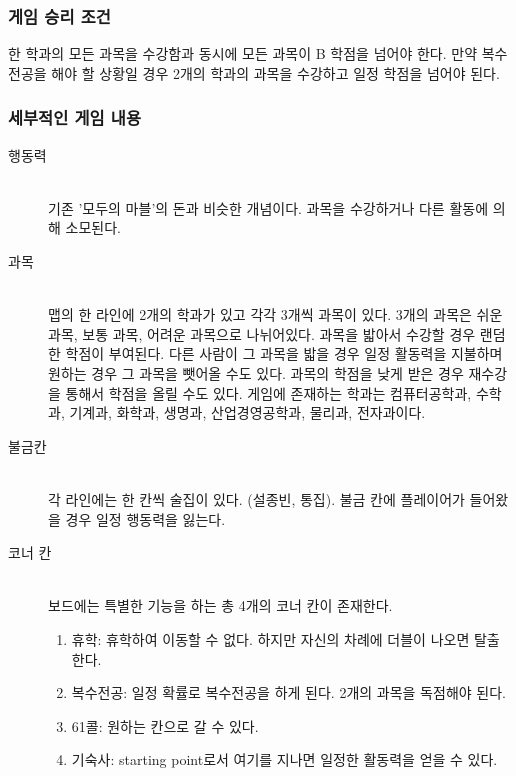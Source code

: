 \documentclass[10pt,oneside,a4paper,titlepage]{article}
\begin{document}
\subsubsection{게임 승리 조건}
한 학과의 모든 과목을 수강함과 동시에 모든 과목이 B 학점을 넘어야 한다. 만약 복수전공을 해야 할 상황일 경우 2개의 학과의 과목을 수강하고 일정 학점을 넘어야 된다.

\subsubsection{세부적인 게임 내용}

\begin{description}

\item[행동력] \hfill \\
기존 '모두의 마블'의 돈과 비슷한 개념이다. 과목을 수강하거나 다른 활동에 의해 소모된다. 

\item[과목] \hfill \\
맵의 한 라인에 2개의 학과가 있고 각각 3개씩 과목이 있다. 3개의 과목은 쉬운 과목, 보통 과목, 어려운 과목으로 나뉘어있다. 과목을 밟아서 수강할 경우 랜덤한 학점이 부여된다. 다른 사람이 그 과목을 밟을 경우 일정 활동력을 지불하며 원하는 경우 그 과목을 뺏어올 수도 있다. 과목의 학점을 낮게 받은 경우 재수강을 통해서 학점을 올릴 수도 있다. 게임에 존재하는 학과는 컴퓨터공학과, 수학과, 기계과, 화학과, 생명과, 산업경영공학과, 물리과, 전자과이다. 

\item[불금칸] \hfill \\
 각 라인에는 한 칸씩 술집이 있다. (설종빈, 통집). 불금 칸에 플레이어가 들어왔을 경우 일정 행동력을 잃는다.
\item[코너 칸] \hfill \\
보드에는 특별한 기능을 하는 총 4개의 코너 칸이 존재한다.
\begin{enumerate}
 \item 휴학: 휴학하여 이동할 수 없다. 하지만 자신의 차례에 더블이 나오면 탈출한다.
 \item 복수전공: 일정 확률로 복수전공을 하게 된다. 2개의 과목을 독점해야 된다.
 \item 61콜: 원하는 칸으로 갈 수 있다.
 \item 기숙사: starting point로서 여기를 지나면 일정한 활동력을 얻을 수 있다.
\end{enumerate}


\end{description}
\end{document}
